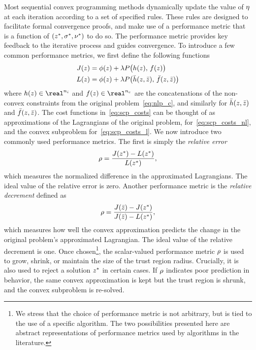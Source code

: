 \documentclass[letterpaper, 10 pt, conference]{ieeeconf}
\begin{document}
Most sequential convex programming methods dynamically update the value of $\eta$ at each iteration according to a set of specified rules. These rules are designed to facilitate formal convergence proofs, and make use of a performance metric that is a function of $(z^*,\sigma^*,\nu^*)$ to do so. The performance metric provides key feedback to the iterative process and guides convergence. To introduce a few common performance metrics, we first define the following functions
\begin{subequations}\label{eq:scp_costs}
\begin{align}
J(z) &= \phi(z) + \lambda P\big( h(z),\,f(z) \big) \label{eq:scp_costs_nl}\\
L(z) &= \phi(z) + \lambda P\big( \bar{h}(z,\bar{z}),\,\bar{f}(z,\bar{z}) \big) \label{eq:scp_costs_l}
\end{align}
\end{subequations}
where $\fni(\z) \in \real^{n_i}$ and $\fne(\z)\in\real^{n_e}$ are the concatenations of the non-convex constraints from the original problem~\eqref{eq:nlp_c}, and similarly for $\bar{h}(z,\bar{z})$ and $\bar{f}(z,\bar{z})$. The cost functions in~\eqref{eq:scp_costs} can be thought of as approximations of the Lagrangians of the original problem, for~\eqref{eq:scp_costs_nl}, and the convex subproblem for~\eqref{eq:scp_costs_l}. 
%
%
We now introduce two commonly used performance metrics. The first is simply the \textit{relative error}
\begin{equation}
\rho = \frac{J(z^*) - L(z^*)}{L(z^*)},
\label{eq:pmet_rel_error}
\end{equation}
which measures the normalized difference in the approximated Lagrangians. The ideal value of the relative error is zero. Another performance metric is the \textit{relative decrement} defined as
\begin{equation}
\rho = \frac{J(\bar{z}) - J(z^*)}{J(\bar{z}) - L(z^*)},
\label{eq:pmet_rel_decrement}
\end{equation}
which measures how well the convex approximation predicts the change in the original problem's approximated Lagrangian. The ideal value of the relative decrement is one. Once chosen\footnote{We stress that the choice of performance metric is not arbitrary, but is tied to the use of a specific algorithm. The two possibilities presented here are abstract representations of performance metrics used by algorithms in the literature.}, the scalar-valued performance metric $\rho$ is used to grow, shrink, or maintain the size of the trust region radius. Crucially, it is also used to reject a solution $z^*$ in certain cases. If $\rho$ indicates poor prediction in behavior, the same convex approximation is kept but the trust region is shrunk, and the convex subproblem is re-solved. 
\end{document}

